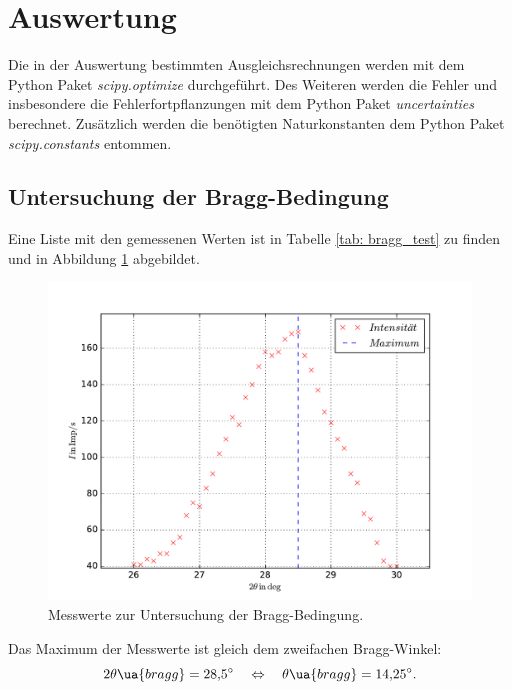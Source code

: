 \section{Auswertung}
Die in der Auswertung bestimmten Ausgleichsrechnungen werden mit
dem Python Paket \emph{scipy.optimize}\cite{scipy} durchgeführt.
Des Weiteren werden die Fehler und insbesondere die Fehlerfortpflanzungen
mit dem Python Paket \emph{uncertainties}\cite{uncertainties} berechnet.
Zusätzlich werden die benötigten Naturkonstanten dem Python Paket \emph{scipy.constants}\cite{scipy}
entommen.
\FloatBarrier
\subsection{Untersuchung der Bragg-Bedingung}
Eine Liste mit den gemessenen Werten ist in Tabelle \ref{tab: bragg_test} zu finden und in Abbildung \ref{fig: bragg_plot} abgebildet.

\begin{figure}
  \centering
  \includegraphics[width=0.8 \textwidth]{../Messdaten/bragbed.pdf}
  \caption{Messwerte zur Untersuchung der Bragg-Bedingung.} %
  \label{fig: bragg_plot}
\end{figure}
Das Maximum der Messwerte ist gleich dem zweifachen Bragg-Winkel:
\begin{equation}
  \label{eq:bestimmt_bragg_winkel}
  2\theta\ua{bragg}=\SI{28.5}{\degree} \quad \Leftrightarrow \quad \theta\ua{bragg}=\SI{14.25}{\degree}.
\end{equation}
\FloatBarrier

\FloatBarrier
